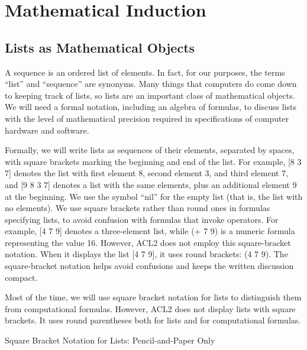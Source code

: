 \chapter{Mathematical Induction}
\label{ch:mathematical-induction}

\section{Lists as Mathematical Objects}
\label{sec:lists-as-obj}
A sequence
is an ordered list of elements.
In fact, for our purposes, the terms ``list'' and ``sequence'' are synonyms.
Many things that computers do come down to keeping track of lists,
so lists are an important class of mathematical objects.
We will need a formal notation, including an algebra of formulas,
to discuss lists with the level of mathematical precision
required in specifications of computer hardware and software.

Formally, we will write lists as sequences of their elements, separated by spaces,
with square brackets marking the beginning and end of the list.
For example, [8 3 7] denotes the list with first element 8,
second element 3, and third element 7, and
[9 8 3 7] denotes a list with the same elements,
plus an additional element 9 at the beginning.
\label{nil-def}
We use the symbol ``nil'' for the empty list
(that is, the list with no elements).
\label{square-brackets}
We use square brackets
rather than round ones in formulas
specifying lists, to avoid confusion with formulas that invoke operators.
For example, [4 7 9] denotes a three-element list,
while (+ 7 9) is a numeric formula representing the value 16.
However, ACL2 does not employ this square-bracket notation.
When it displays the list [4 7 9],
it uses round brackets: (4 7 9).
The square-bracket notation helps avoid confusions
and keeps the written discussion compact.

\begin{aside}
Most of the time, we will use square bracket
notation for lists
to distinguish them from computational formulas.
However, ACL2 does not display lists with square brackets.
It uses round parentheses both for lists and for computational formulas.
\caption{Square Bracket Notation for Lists: Pencil-and-Paper Only}
\label{square-bracket-notation}
\end{aside}

